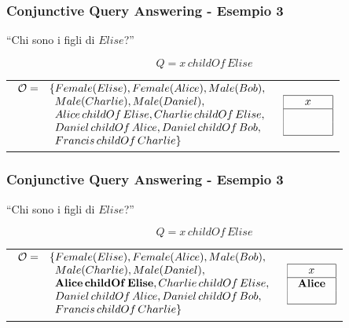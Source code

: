 \documentclass[8pt]{beamer}
\begin{document}
\begin{frame}
\frametitle{Conjunctive Query Answering - Esempio 3}
\begin{center}
``Chi sono i figli di $Elise$?''
\end{center}
\[
 Q=x\,childOf\,Elise
\]
\vspace{\baselineskip}

\begin{tabular}{lc}
$\begin{array}{cl}
  \Ont  =  &  \{Female(Elise),  Female(Alice), Male(Bob), \\
  &\phantom{\{}Male(Charlie), Male(Daniel), \\
  &\phantom{\{}Alice\,childOf\,Elise, Charlie\,childOf\,Elise, \\
  &\phantom{\{}Daniel\,childOf\,Alice, Daniel\,childOf\,Bob, \\
  &\phantom{\{}Francis\,childOf\,Charlie \}\\
\end{array}$ & 
$\begin{array}{|c|}
  \hline
  x\\
  \hline
  \phantom{Alice}\\
  \phantom{Charlie}\\
  \hline
\end{array}$ \\
\end{tabular}
\end{frame}

\begin{frame}
\frametitle{Conjunctive Query Answering - Esempio 3}
\begin{center}
``Chi sono i figli di $Elise$?'' 
\end{center}
\[
 Q=x\,childOf\,Elise
\]
\vspace{\baselineskip}

\begin{tabular}{lc}
$\begin{array}{cl}
  \Ont  =  &  \{Female(Elise),  Female(Alice), Male(Bob), \\
  &\phantom{\{}Male(Charlie), Male(Daniel), \\
  &\phantom{\{}\mathbf{Alice\,childOf\,Elise}, Charlie\,childOf\,Elise, \\
  &\phantom{\{}Daniel\,childOf\,Alice, Daniel\,childOf\,Bob, \\
  &\phantom{\{}Francis\,childOf\,Charlie \}\\
\end{array}$ & 
$\begin{array}{|c|}
  \hline
  x\\
  \hline
  \mathbf{Alice}\\
  \phantom{Charlie}\\
  \hline
\end{array}$ \\
\end{tabular}
\end{frame}
\end{document}

